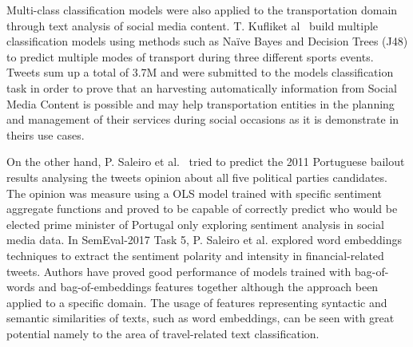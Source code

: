 Multi-class classification models were also applied to the transportation domain through text analysis of social media content. T. Kufliket al~\cite{kuflik2017automating} build multiple classification models using methods such as Naïve Bayes and Decision Trees (J48) to predict multiple modes of transport during three different sports events. Tweets sum up a total of 3.7M and were submitted to the models classification task in order to prove that an harvesting automatically information from Social Media Content is possible and may help transportation entities in the planning and management of their services during social occasions as it is demonstrate in theirs use cases.

On the other hand, P. Saleiro et al.~\cite{saleiro2016sentiment} tried to predict the 2011 Portuguese bailout results analysing the tweets opinion about all five political parties candidates. The opinion was measure using a OLS model trained with specific sentiment aggregate functions and proved to be capable of correctly predict who would be elected prime minister of Portugal only exploring sentiment analysis in social media data. In SemEval-2017 Task 5, P. Saleiro et al. explored word embeddings techniques to extract the sentiment polarity and intensity in financial-related tweets. Authors have proved good performance of models trained with bag-of-words and bag-of-embeddings features together although the approach been applied to a specific domain. The usage of features representing syntactic and semantic similarities of texts, such as word embeddings, can be seen with great potential namely to the area of travel-related text classification.

